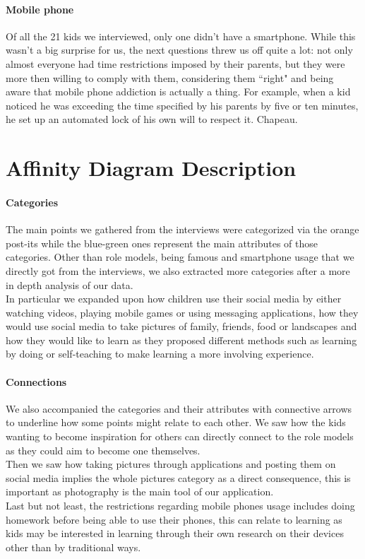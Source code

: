 \documentclass[12pt]{scrartcl}
\begin{document}
		\paragraph{Mobile phone} Of all the 21 kids we interviewed, only one didn't have a smartphone. While this wasn't a big surprise for us, the next questions threw us off quite a lot: not only almost everyone had time restrictions imposed by their parents, but they were more then willing to comply with them, considering them ``right" and being aware that mobile phone addiction is actually a thing. For example, when a kid noticed he was exceeding the time specified by his parents by five or ten minutes, he set up an automated lock of his own will to respect it. Chapeau.
		

\section*{Affinity Diagram Description}

	\paragraph{Categories} The main points we gathered from the interviews were categorized via
the orange post-its while the blue-green ones represent the main attributes of those categories. 
Other than role models, being famous and smartphone usage that we directly got from the 
interviews, we also extracted more categories after a more in depth analysis of our data.\\
In particular we expanded upon how children use their social media by either watching videos, 
playing mobile games or using messaging applications, how they would use social media to take 
pictures of family, friends, food or landscapes and how they would like to learn as they proposed 
different methods such as learning by doing or self-teaching to make learning a more involving 
experience.

	\paragraph{Connections} We also accompanied the categories and their attributes with 
connective arrows to underline how some points might relate to each other. We saw how the kids
wanting to become inspiration for others can directly connect to the role models as they could
aim to become one themselves.\\
Then we saw how taking pictures through applications and posting them on social media implies
the whole pictures category as a direct consequence, this is important as photography is the main
tool of our application.\\
Last but not least, the restrictions regarding mobile phones usage includes doing homework
before being able to use their phones, this can relate to learning as kids may be interested in
learning through their own research on their devices other than by traditional ways.
\end{document}
